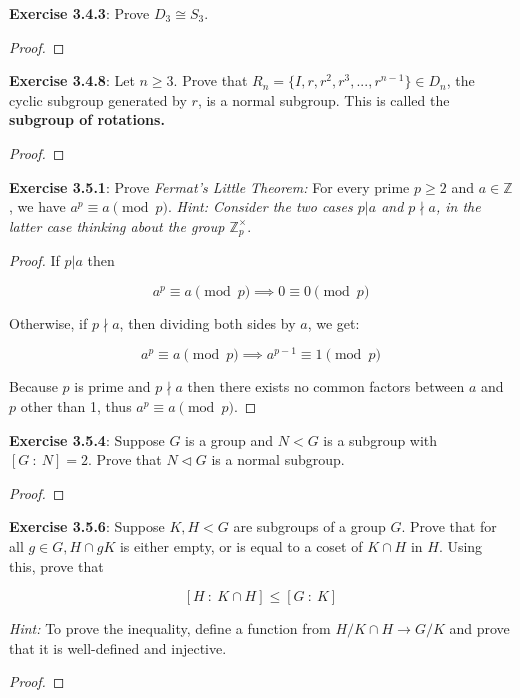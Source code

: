 \documentclass[a4paper]{article}
\begin{document}
\begin{myparindent}{0pt}
\textbf{Exercise 3.4.3}:
Prove $D_3 \cong S_3$.
\begin{proof}
\end{proof}

\textbf{Exercise 3.4.8}:
Let $n \ge 3$. Prove that $R_n = \{ I, r, r^2, r^3, ..., r^{n - 1} \} \in D_n$,
the cyclic subgroup generated by $r$, is a normal subgroup. This is called the
\textbf{subgroup of rotations.}
\begin{proof}
\end{proof}

\textbf{Exercise 3.5.1}:
Prove \textit{Fermat's Little Theorem:} For every prime $p \ge 2$ and
$a \in \mathbb{Z}$, we have $a^p \equiv a \pmod p$. \textit{Hint: Consider the
two cases $p|a$ and $p \nmid a$, in the latter case thinking about the group
$\mathbb{Z}_p^{\times}$}.
\begin{proof}
  If $p | a$ then

  \[ a^p \equiv a \pmod p \implies 0 \equiv 0 \pmod p \]

  Otherwise, if $p \nmid a$, then dividing both sides by $a$, we get:

  \[ a^p \equiv a \pmod p \implies a^{p-1} \equiv 1 \pmod p \]

  Because $p$ is prime and $p \nmid a$ then there exists no common factors
  between $a$ and $p$ other than 1, thus $a^p \equiv a \pmod p$.
\end{proof}

\textbf{Exercise 3.5.4}:
Suppose $G$ is a group and $N < G$ is a subgroup with $[G ~: ~N] = 2$. Prove
that $N \triangleleft G$ is a normal subgroup.
\begin{proof}
\end{proof}

\textbf{Exercise 3.5.6}:
Suppose $K, H < G$ are subgroups of a group $G$. Prove that for all $g \in G,
H \cap gK$ is either empty, or is equal to a coset of $K \cap H$ in $H$. Using
this, prove that

\[ [H ~: ~K \cap H] \le [G ~: ~K] \]

\textit{Hint:} To prove the inequality, define a function from $H/K \cap H
\rightarrow G/K$ and prove that it is well-defined and injective.
\begin{proof}
\end{proof}

\end{myparindent}
\end{document}
